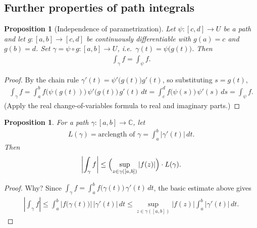 \documentclass[11pt]{article}
\theoremstyle{plain}
\newtheorem{proposition}[theorem]{Proposition}
\theoremstyle{definition}
\theoremstyle{remark}
\numberwithin{equation}{section}
\newcommand{\be}{\begin{eqnarray}}
\newcommand{\ee}{\end{eqnarray}}
\newcommand{\C}{\mathbb{C}}
\begin{document}
\subsection*{Further properties of path integrals}
\begin{proposition}[Independence of parametrization]
\label{prop:reparam}
Let $\psi\colon[c,d]\to U$ be a path and let $g\colon[a,b]\to[c,d]$ be
continuously differentiable with $g(a)=c$ and $g(b)=d$. Set
$\gamma=\psi\circ g\colon[a,b]\to U$, i.e.\ $\gamma(t)=\psi\bigl(g(t)\bigr)$. Then
\be
 \int_\gamma f=\int_\psi f.
\ee
\end{proposition}

\begin{center}
\end{center}

\begin{proof}
By the chain rule $\gamma'(t)=\psi'\bigl(g(t)\bigr)g'(t)$, so substituting
$s=g(t)$,
\be
 \int_\gamma f=\int_a^bf\bigl(\psi(g(t))\bigr)\,\psi'\bigl(g(t)\bigr)\,g'(t)\,dt
 =\int_c^df\bigl(\psi(s)\bigr)\,\psi'(s)\,ds=\int_\psi f.
\ee
(Apply the real change-of-variables formula to real and imaginary parts.)
\end{proof}

\begin{proposition}
\label{prop:ML}
For a path $\gamma\colon[a,b]\to\C$, let
\be
 L(\gamma)=\text{arclength of }\gamma=\int_a^b|\gamma'(t)|\,dt.
\ee
Then
\be
 \left|\int_\gamma f\right|\leq\Bigl(\sup_{z\in\gamma([a,b])}|f(z)|\Bigr)\cdot L(\gamma).
\ee
\end{proposition}

\begin{proof}
Why? Since $\int_\gamma f=\int_a^bf\bigl(\gamma(t)\bigr)\,\gamma'(t)\,dt$, the
basic estimate above gives
\be
 \left|\int_\gamma f\right|\leq\int_a^b\bigl|f\bigl(\gamma(t)\bigr)\bigr|\,|\gamma'(t)|\,dt
 \leq\sup_{z\in\gamma([a,b])}|f(z)|\int_a^b|\gamma'(t)|\,dt.
\ee
\end{proof}
\end{document}
